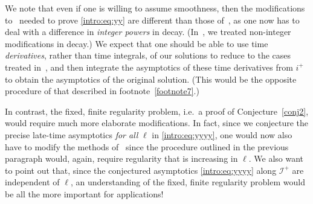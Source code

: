 \documentclass[11pt,english]{article}
\numberwithin{equation}{section}
\theoremstyle{remark}
\theoremstyle{plain}
\theoremstyle{remark}
\renewcommand{\(}{\left(}
\renewcommand{\)}{\right)}
\begin{document}
 We note that even if one is willing to assume smoothness, then the modifications to~\cite{AAG21} needed to prove \eqref{intro:eq:yy} are different than those of~\cite{II}, as one now has to deal with a difference in \textit{integer powers} in decay. 
 (In~\cite{II}, we treated non-integer modifications in decay.) 
 We expect that one should be able to use time \textit{derivatives}, rather than time integrals, of our solutions to reduce to the cases treated in~\cite{AAG21}, and then integrate the asymptotics of these time derivatives from $i^+$ to obtain the asymptotics of the original solution.  
 (This would be the opposite procedure of that described in footnote~\ref{footnote7}.) 
 
 In contrast, the fixed, finite regularity problem, i.e.\ a proof of Conjecture~\ref{conj2}, would require much more elaborate modifications.
 In fact, since we conjecture the precise late-time asymptotics \textit{for all} $\ell$ in \eqref{intro:eq:yyyy}, one would now also have to modify the methods of~\cite{AAG21} since the procedure outlined in the previous paragraph would, again, require regularity that is increasing in $\ell$.
 We also want to point out that, since the conjectured asymptotics \eqref{intro:eq:yyyy} along $\mathcal I^+$ are independent of $\ell$, an understanding of the fixed, finite regularity problem would be all the  more important for applications!
\end{document}
